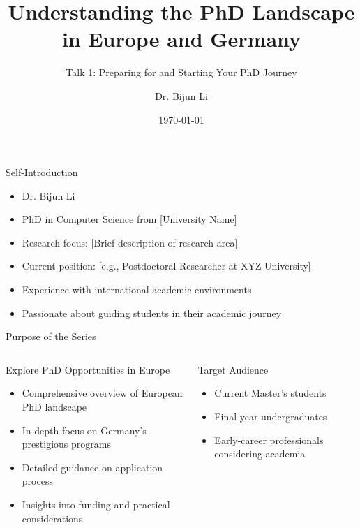 \documentclass[10pt]{beamer}
\title{Understanding the PhD Landscape in Europe and Germany}
\subtitle{Talk 1: Preparing for and Starting Your PhD Journey}
\date{\today}
\author{Dr. Bijun Li}
\begin{document}
\maketitle


\begin{frame}[fragile]{Self-Introduction}
\begin{itemize}
    \item Dr. Bijun Li
    \item PhD in Computer Science from [University Name]
    \item Research focus: [Brief description of research area]
    \item Current position: [e.g., Postdoctoral Researcher at XYZ University]
    \item Experience with international academic environments
    \item Passionate about guiding students in their academic journey
\end{itemize}
\end{frame}

\begin{frame}[fragile]{Purpose of the Series}
\begin{columns}[T]
    \begin{column}{0.6\textwidth}
        \alert{Explore PhD Opportunities in Europe}
        \begin{itemize}
            \item Comprehensive overview of European PhD landscape
            \item In-depth focus on Germany's prestigious programs
            \item Detailed guidance on application process
            \item Insights into funding and practical considerations
        \end{itemize}
    \end{column}
    \begin{column}{0.4\textwidth}
        \alert{Target Audience}
        \begin{itemize}
            \item Current Master's students
            \item Final-year undergraduates
            \item Early-career professionals considering academia
        \end{itemize}
    \end{column}
\end{columns}
\end{frame}
\end{document}
